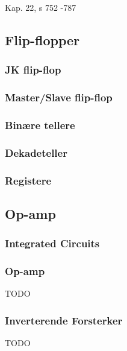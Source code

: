 Kap. 22, s 752 -787

\subsection{Flip-flopper}
  
  \subsubsection{JK flip-flop}
    
  \subsubsection{Master/Slave flip-flop}
    
  \subsubsection{Binære tellere}
    
  \subsubsection{Dekadeteller}
    
  \subsubsection{Registere}
    

\subsection{Op-amp}
  \subsubsection{Integrated Circuits}
    
  \subsubsection{Op-amp}
    TODO
  \subsubsection{Inverterende Forsterker}
    TODO

